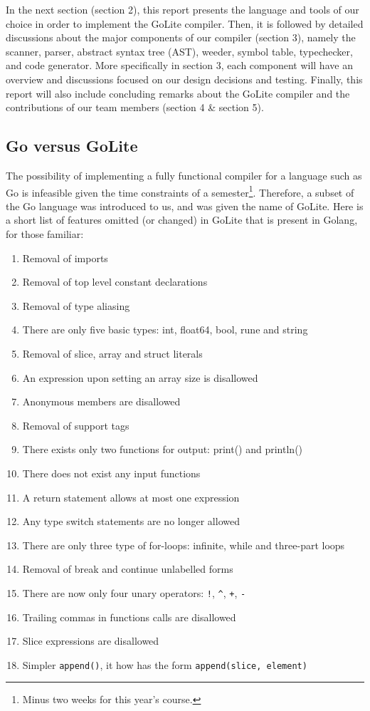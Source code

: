 \documentclass{article}
\begin{document}
In the next section (section 2), this report presents the language and tools of our choice in order to implement the GoLite compiler. Then, it is followed by detailed discussions about the major components of our compiler (section 3), namely the scanner, parser, abstract syntax tree (AST), weeder, symbol table, typechecker, and code generator. More specifically in section 3, each component will have an overview and discussions focused on our design decisions and testing. Finally, this report will also include concluding remarks about the GoLite compiler and the contributions of our team members (section 4 \& section 5).

\subsection{Go versus GoLite}

The possibility of implementing a fully functional compiler for a language such as Go is infeasible given the time constraints of a semester\footnote{Minus two weeks for this year's course.}. Therefore, a subset of the Go language was introduced to us, and was given the name of GoLite. Here is a short list of features omitted (or changed) in GoLite that is present in Golang, for those familiar:

\begin{enumerate}
    \item Removal of imports
    \item Removal of top level constant declarations
    \item Removal of type aliasing
    \item There are only five basic types: int, float64, bool, rune and string
    \item Removal of slice, array and struct literals
    \item An expression upon setting an array size is disallowed
    \item Anonymous members are disallowed
    \item Removal of support tags
    \item There exists only two functions for output: print() and println()
    \item There does not exist any input functions
    \item A return statement allows at most one expression
    \item Any type switch statements are no longer allowed
    \item There are only three type of for-loops: infinite, while and three-part loops
    \item Removal of break and continue unlabelled forms
    \item There are now only four unary operators: \verb|!|, \verb|^|, \verb|+|, \verb|-|
    \item Trailing commas in functions calls are disallowed
    \item Slice expressions are disallowed
    \item Simpler \texttt{append()}, it how has the form \texttt{append(slice, element)}
\end{enumerate}
\end{document}
